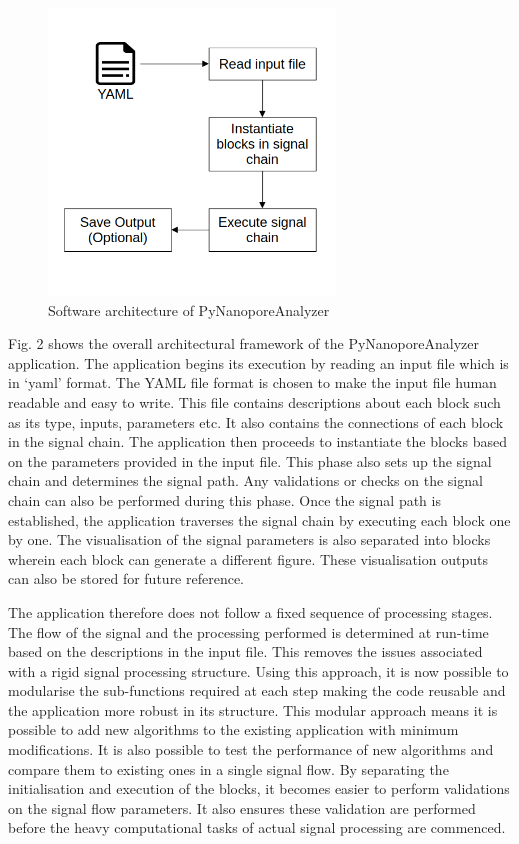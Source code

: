 \documentclass[journal]{IEEEtran}
\begin{document}
\begin{figure}[!t]
\centering
\includegraphics[width=3in]{SW-Arch.png}
\caption{Software architecture of PyNanoporeAnalyzer}
\label{fig_2}
\end{figure}

Fig. 2 shows the overall architectural framework of the PyNanoporeAnalyzer application. The application begins its execution by reading an input file which is in ‘yaml’ format. The YAML file format is chosen to make the input file human readable and easy to write. This file contains descriptions about each block such as its type, inputs, parameters etc. It also contains the connections of each block in the signal chain. The application then proceeds to instantiate the blocks based on the parameters provided in the input file. This phase also sets up the signal chain and determines the signal path. Any validations or checks on the signal chain can also be performed during this phase. Once the signal path is established, the application traverses the signal chain by executing each block one by one. The visualisation of the signal parameters is also separated into blocks wherein each block can generate a different figure. These visualisation outputs can also be stored for future reference.
	
The application therefore does not follow a fixed sequence of processing stages. The flow of the signal and the processing performed is determined at run-time based on the descriptions in the input file. This removes the issues associated with a rigid signal processing structure. Using this approach, it is now possible to modularise the sub-functions required at each step making the code reusable and the application more robust in its structure. This modular approach means it is possible to add new algorithms to the existing application with minimum modifications. It is also possible to test the performance of new algorithms and compare them to existing ones in a single signal flow. By separating the initialisation and execution of the blocks, it becomes easier to perform validations on the signal flow parameters. It also ensures these validation are performed before the heavy computational tasks of actual signal processing are commenced. 
\end{document}
